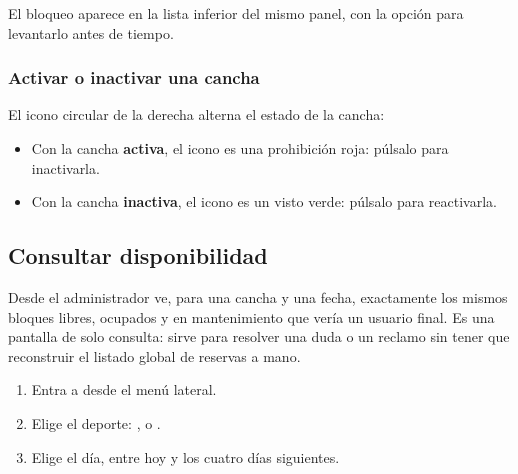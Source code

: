 El bloqueo aparece en la lista inferior del mismo panel, con la opción
 para levantarlo antes de tiempo.


\subsubsection{Activar o inactivar una cancha}

El icono circular de la derecha alterna el estado de la cancha:

\begin{itemize}
  \item Con la cancha \textbf{activa}, el icono es una prohibición roja:
        púlsalo para inactivarla.
  \item Con la cancha \textbf{inactiva}, el icono es un visto verde:
        púlsalo para reactivarla.
\end{itemize}



\subsection{Consultar disponibilidad}
\label{sec:admin:disponibilidad}

Desde  el administrador ve, para una cancha y una
fecha, exactamente los mismos bloques libres, ocupados y en mantenimiento
que vería un usuario final. Es una pantalla de solo consulta: sirve para
resolver una duda o un reclamo sin tener que reconstruir el listado global
de reservas a mano.

\begin{enumerate}
  \item Entra a  desde el menú lateral.
  \item Elige el deporte: ,  o .
  \item Elige el día, entre hoy y los cuatro días siguientes.
\end{enumerate}

